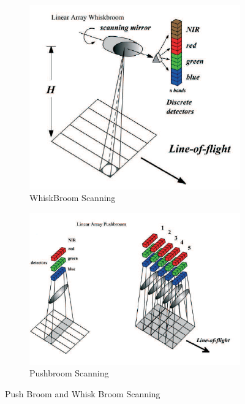 \begin{itemize}
\begin{figure}[ht]
\begin{subfigure}{0.80\textwidth}
  \includegraphics[width=0.75\linewidth]{pics/WhiskBroom}
  \caption{WhiskBroom Scanning}
  \label{fig:Whiskbroom}
\end{subfigure}
\begin{subfigure}{0.80\textwidth}
  \centering
  \includegraphics[width=0.75\linewidth]{pics/PushBroom}
  \caption{Pushbroom Scanning}
  \label{fig:Pushbroom}
\end{subfigure}
\caption{Push Broom and Whisk Broom Scanning\cite{SpInst}}
\label{fig:test}
\end{figure}


\end{itemize}
